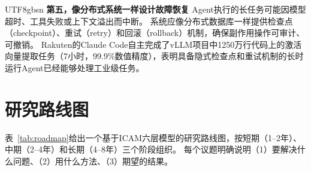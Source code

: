 \documentclass[11pt,a4paper]{article}
\begin{document}
\begin{CJK*}{UTF8}{gbsn}
\textbf{第五，像分布式系统一样设计故障恢复}
Agent执行的长任务可能因模型超时、工具失败或上下文溢出而中断。
系统应像分布式数据库一样提供检查点（checkpoint）、重试（retry）和回滚（rollback）机制，确保副作用操作可审计、可撤销\cite{raft2014,spanner2012}。
Rakuten的Claude Code自主完成了vLLM项目中1250万行代码上的激活向量提取任务（7小时，99.9\%数值精度）\cite{anthropic2026agenticreport}，表明具备隐式检查点和重试机制的长时运行Agent已经能够处理工业级任务。

\section{研究路线图}
\label{sec:roadmap}

表~\ref{tab:roadmap}给出一个基于ICAM六层模型的研究路线图，按短期（1--2年）、中期（2--4年）和长期（4--8年）三个阶段组织。
每个议题明确说明（1）要解决什么问题、（2）用什么方法、（3）期望的结果。


\end{CJK*}
\end{document}
